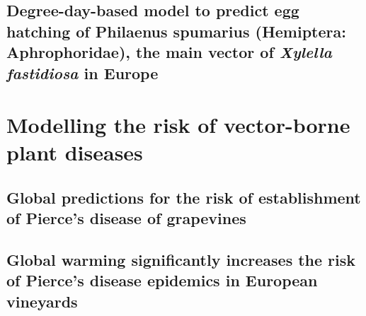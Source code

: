 \documentclass[
	10pt, %
	fleqn, %
	a4paper, %
]{LegrandOrangeBook}
\begin{document}
\chapter{Degree-day-based model to predict egg hatching of Philaenus spumarius
  (Hemiptera: Aphrophoridae), the main vector of \textit{Xylella fastidiosa} in
  Europe}
%


\part{Modelling the risk of vector-borne plant diseases}
\chapterspaceabove{6.75cm}
\chapterspacebelow{7.25cm}

\chapter{Global predictions for the risk of establishment of Pierce’s disease
  of grapevines}
%

\chapterspaceabove{6.75cm}
\chapterspacebelow{7.25cm}

\chapter{Global warming significantly increases the risk of Pierce's disease
  epidemics in European vineyards}
%

\chapterspaceabove{6.75cm}
\chapterspacebelow{7.25cm}
\end{document}
